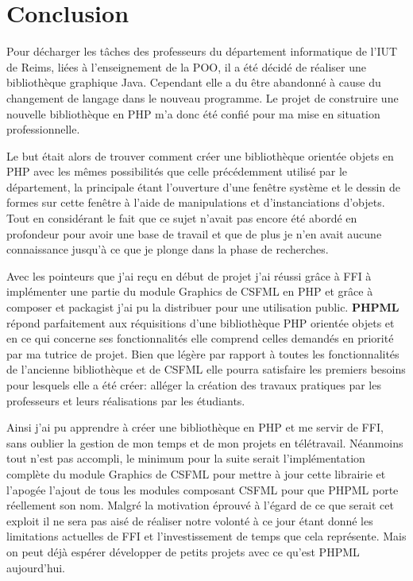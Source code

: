 \documentclass[11pt,a4paper,krantz2,11pt,oneside]{krantz}
\begin{document}
\hypertarget{conclusion}{%
\chapter*{Conclusion}\label{conclusion}}


Pour décharger les tâches des professeurs du département informatique de l'IUT de Reims, liées à l'enseignement de la POO, il a été décidé de réaliser une bibliothèque graphique Java. Cependant elle a du être abandonné à cause du changement de langage dans le nouveau programme. Le projet de construire une nouvelle bibliothèque en PHP m'a donc été confié pour ma mise en situation professionnelle.

Le but était alors de trouver comment créer une bibliothèque orientée objets en PHP avec les mêmes possibilités que celle précédemment utilisé par le département, la principale étant l'ouverture d'une fenêtre système et le dessin de formes sur cette fenêtre à l'aide de manipulations et d'instanciations d'objets. Tout en considérant le fait que ce sujet n'avait pas encore été abordé en profondeur pour avoir une base de travail et que de plus je n'en avait aucune connaissance jusqu'à ce que je plonge dans la phase de recherches.

Avec les pointeurs que j'ai reçu en début de projet j'ai réussi grâce à FFI à implémenter une partie du module Graphics de CSFML en PHP et grâce à composer et packagist j'ai pu la distribuer pour une utilisation public. \textbf{PHPML} répond parfaitement aux réquisitions d'une bibliothèque PHP orientée objets et en ce qui concerne ses fonctionnalités elle comprend celles demandés en priorité par ma tutrice de projet. Bien que légère par rapport à toutes les fonctionnalités de l'ancienne bibliothèque et de CSFML elle pourra satisfaire les premiers besoins pour lesquels elle a été créer: alléger la création des travaux pratiques par les professeurs et leurs réalisations par les étudiants.

Ainsi j'ai pu apprendre à créer une bibliothèque en PHP et me servir de FFI, sans oublier la gestion de mon temps et de mon projets en télétravail. Néanmoins tout n'est pas accompli, le minimum pour la suite serait l'implémentation complète du module Graphics de CSFML pour mettre à jour cette librairie et l'apogée l'ajout de tous les modules composant CSFML pour que PHPML porte réellement son nom. Malgré la motivation éprouvé à l'égard de ce que serait cet exploit il ne sera pas aisé de réaliser notre volonté à ce jour étant donné les limitations actuelles de FFI et l'investissement de temps que cela représente. Mais on peut déjà espérer développer de petits projets avec ce qu'est PHPML aujourd'hui.
\end{document}
